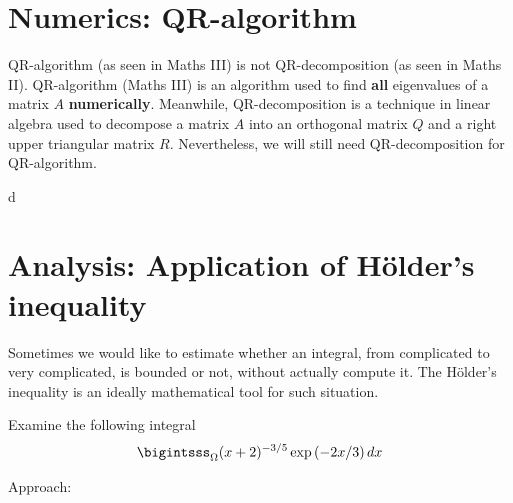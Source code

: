 \documentclass[12pt]{article}
\begin{document}
\section{Numerics: QR-algorithm}
\begin{observationboxed}
	QR-algorithm (as seen in Maths III) is not QR-decomposition (as seen in Maths II). 
	QR-algorithm (Maths III) is an algorithm used to find 
	\textbf{all} eigenvalues of a matrix $A$ \textbf{numerically}. Meanwhile, 
	QR-decomposition is a technique in linear algebra used to decompose 
	a matrix $A$ into an orthogonal matrix $Q$ and a right upper triangular matrix $R$.
	Nevertheless, we will still need QR-decomposition for QR-algorithm.
\end{observationboxed}
d
\clearpage
\clearpage
\section{Analysis: Application of Hölder's inequality}
\begin{observationboxed}
	Sometimes we would like to estimate whether an integral, from complicated to very complicated, 
	is bounded or not, without actually compute it. 
	The Hölder's inequality is an ideally mathematical tool for such situation.
\end{observationboxed}
\begin{exampleboxed}
	Examine the following integral
	\begin{align*}
		\bigintsss_{\Omega} (x + 2)^{-3/5} \exp{(-2x/3)} \, dx
	\end{align*}
\end{exampleboxed}
Approach:



\end{document}
